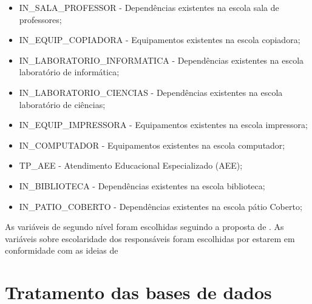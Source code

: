 \begin{itemize}
		\item IN\_SALA\_PROFESSOR - Dependências existentes na escola sala de professores;
		\item IN\_EQUIP\_COPIADORA - Equipamentos existentes na escola copiadora;
		\item IN\_LABORATORIO\_INFORMATICA - Dependências existentes na escola laboratório de informática;
		\item IN\_LABORATORIO\_CIENCIAS - Dependências existentes na escola laboratório de ciências;
		\item IN\_EQUIP\_IMPRESSORA - Equipamentos existentes na escola impressora;
		\item IN\_COMPUTADOR - Equipamentos existentes na escola computador;
		\item TP\_AEE - Atendimento Educacional Especializado (AEE);
		\item IN\_BIBLIOTECA -  Dependências existentes na escola biblioteca;
		\item IN\_PATIO\_COBERTO - Dependências existentes na escola pátio Coberto;
	\end{itemize}
	As variáveis de segundo nível foram escolhidas seguindo a proposta de . As variáveis sobre escolaridade dos responsáveis foram escolhidas por estarem em conformidade com as ideias de 
\section{Tratamento das bases de dados}
